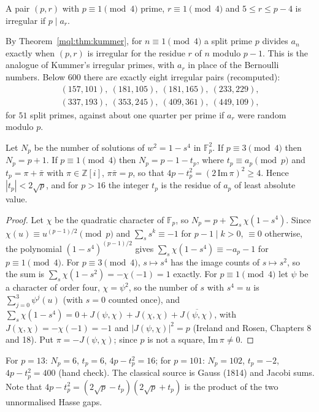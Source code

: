 \begin{definition}\label{mql:def:irr}
A pair $(p,r)$ with $p\equiv1\pmod4$ prime, $r\equiv1\pmod4$ and $5\le r\le p-4$ is irregular if $p\mid a_r$.
\end{definition}

By Theorem~\ref{mql:thm:kummer}, for $n\equiv1\pmod4$ a split prime $p$ divides $a_n$ exactly when $(p,r)$ is irregular for the residue $r$ of $n$ modulo $p-1$. This is the analogue of Kummer's irregular primes, with $a_r$ in place of the Bernoulli numbers. Below $600$ there are exactly eight irregular pairs (recomputed):
\begin{gather*}
(157,101),\ (181,105),\ (181,165),\ (233,229),\\ (337,193),\ (353,245),\ (409,361),\ (449,109),
\end{gather*}
for $51$ split primes, against about one quarter per prime if $a_r$ were random modulo $p$.

\begin{theorem}\label{mql:thm:trace}
Let $N_p$ be the number of solutions of $w^2=1-s^4$ in $\mathbb F_p^2$. If $p\equiv3\pmod4$ then $N_p=p+1$. If $p\equiv1\pmod4$ then $N_p=p-1-t_p$, where $t_p\equiv a_p\pmod p$ and $t_p=\pi+\bar\pi$ with $\pi\in\mathbb Z[i]$, $\pi\bar\pi=p$, so that $4p-t_p^2=(2\,\mathrm{Im}\,\pi)^2\ge4$. Hence $|t_p|<2\sqrt p$, and for $p>16$ the integer $t_p$ is the residue of $a_p$ of least absolute value.
\end{theorem}

\begin{proof}
Let $\chi$ be the quadratic character of $\mathbb F_p$, so $N_p=p+\sum_s\chi(1-s^4)$. Since $\chi(u)\equiv u^{(p-1)/2}\pmod p$ and $\sum_ss^k\equiv-1$ for $p-1\mid k>0$, $\equiv0$ otherwise, the polynomial $(1-s^4)^{(p-1)/2}$ gives $\sum_s\chi(1-s^4)\equiv-a_p-1$ for $p\equiv1\pmod4$. For $p\equiv3\pmod4$, $s\mapsto s^4$ has the image counts of $s\mapsto s^2$, so the sum is $\sum_s\chi(1-s^2)=-\chi(-1)=1$ exactly. For $p\equiv1\pmod4$ let $\psi$ be a character of order four, $\chi=\psi^2$, so the number of $s$ with $s^4=u$ is $\sum_{j=0}^3\psi^j(u)$ (with $s=0$ counted once), and $\sum_s\chi(1-s^4)=0+J(\psi,\chi)+J(\chi,\chi)+\overline{J(\psi,\chi)}$, with $J(\chi,\chi)=-\chi(-1)=-1$ and $|J(\psi,\chi)|^2=p$ (Ireland and Rosen, Chapters 8 and 18). Put $\pi=-J(\psi,\chi)$; since $p$ is not a square, $\mathrm{Im}\,\pi\ne0$.
\end{proof}

For $p=13$: $N_p=6$, $t_p=6$, $4p-t_p^2=16$; for $p=101$: $N_p=102$, $t_p=-2$, $4p-t_p^2=400$ (hand check). The classical source is Gauss (1814) and Jacobi sums. Note that $4p-t_p^2=(2\sqrt p-t_p)(2\sqrt p+t_p)$ is the product of the two unnormalised Hasse gaps.

